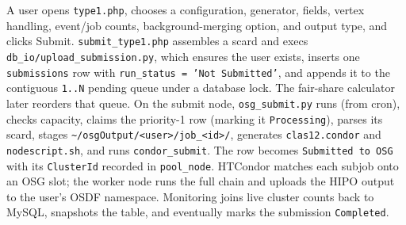 A user opens \texttt{type1.\allowbreak{}php}, chooses a configuration, generator, fields, vertex handling, event/job counts, background-merging option, and output type, and clicks Submit. \texttt{submit\_\allowbreak{}type1.\allowbreak{}php} assembles a scard and execs \texttt{db\_\allowbreak{}io/\allowbreak{}upload\_\allowbreak{}submission.\allowbreak{}py}, which ensures the user exists, inserts one \texttt{submissions} row with \texttt{run\_\allowbreak{}status =\allowbreak{} 'Not Submitted'}, and appends it to the contiguous \texttt{1.\allowbreak{}.\allowbreak{}N} pending queue under a database lock. The fair-share calculator later reorders that queue. On the submit node, \texttt{osg\_\allowbreak{}submit.\allowbreak{}py} runs (from cron), checks capacity, claims the priority-1 row (marking it \texttt{Processing}), parses its scard, stages \texttt{\textasciitilde{}/\allowbreak{}osgOutput/\allowbreak{}<user>/\allowbreak{}job\_\allowbreak{}<id>/\allowbreak{}}, generates \texttt{clas12.\allowbreak{}condor} and \texttt{nodescript.\allowbreak{}sh}, and runs \texttt{condor\_\allowbreak{}submit}. The row becomes \texttt{Submitted to OSG} with its \texttt{ClusterId} recorded in \texttt{pool\_\allowbreak{}node}. HTCondor matches each subjob onto an OSG slot; the worker node runs the full chain and uploads the HIPO output to the user's OSDF namespace. Monitoring joins live cluster counts back to MySQL, snapshots the table, and eventually marks the submission \texttt{Completed}.

